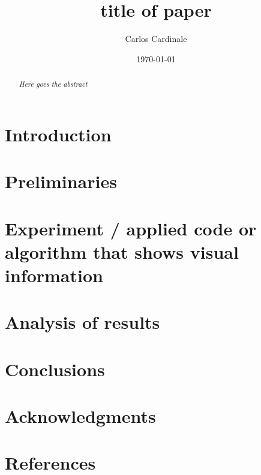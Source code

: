 \documentclass[aps,twocolumn,secnumarabic,nobalancelastpage,amsmath,amssymb,nofootinbib]{revtex4-1}
\begin{document}
	\title			{title of paper} %
	\author			{Carlos Cardinale} %
	\date			{\today}
	
		\begin{abstract}
			\textit{Here goes the abstract} 	
		\end{abstract}
	
	\maketitle
	     	    
	\section{Introduction}
					
	\section{Preliminaries}
		
	\section{Experiment / applied code or algorithm that shows visual information}
		     	  		
	\section{Analysis of results}
	
	\section{Conclusions}
	
	\section{Acknowledgments}
	
	\section{References}
	
	
		
	
	
\end{document}

